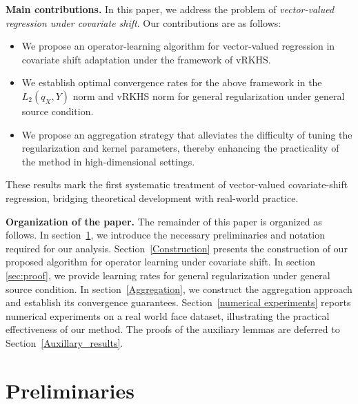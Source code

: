 \documentclass[twoside,11pt]{article}
\begin{document}
\vspace{0.5em}

\noindent
\textbf{Main contributions.} In this paper, we address the problem of \emph{vector-valued regression under covariate shift}. Our contributions are as follows: \begin{itemize} 


\item We propose an operator-learning algorithm for vector-valued regression in covariate shift adaptation under the framework of vRKHS. 

\item  We establish optimal convergence rates for the above framework in the \( L_2(q_X, Y) \) norm and vRKHS norm for general regularization under general source condition.

\item We propose an aggregation strategy that alleviates the difficulty of tuning the regularization and kernel parameters, thereby enhancing the practicality of the method in high-dimensional settings. %
\end{itemize} These results mark the first systematic treatment of vector-valued covariate-shift regression, bridging theoretical development with real-world practice. 

\medskip 

\noindent
\textbf{Organization of the paper.} The remainder of this paper is organized as follows. In section~\ref{sec:preliminaries}, we introduce the necessary preliminaries and notation required for our analysis. 
Section~\ref{Construction} presents the construction of our proposed algorithm for operator learning under covariate shift. In section \ref{sec:proof}, we provide learning rates for general regularization under general source condition. In section~\ref{Aggregation}, we construct the aggregation approach and establish its convergence guarantees. Section~\ref{numerical experiments} reports numerical experiments on a real world face dataset, illustrating the practical effectiveness of our method. The proofs of the auxiliary lemmas are deferred to Section~\ref{Auxillary_results}. 

\section{Preliminaries}\label{sec:preliminaries}
\end{document}

